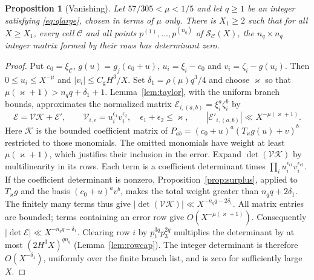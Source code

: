 \documentclass[11pt,reqno]{amsart}
\newtheorem{proposition}[theorem]{Proposition}
\theoremstyle{definition}
\theoremstyle{remark}
\numberwithin{equation}{section}
\begin{document}
\begin{proposition}[Vanishing]\label{prop:vanish}
Let $57/305<\mu<1/5$ and let $q\ge1$ be an integer satisfying
\eqref{eq:qlarge}, chosen in terms of $\mu$ only. There is $X_1\ge2$ such that for all $X\ge X_1$, every
cell $\mathcal C$ and all points $p^{(1)},\dots,p^{(n_q)}$ of
$\mathcal S_{\mathcal C}(X)$, the $n_q\times n_q$ integer matrix formed by
their rows has determinant zero.
\end{proposition}
\begin{proof}
Put $c_0=\xi_{\mathcal C}$, $g(u)=g_j(c_0+u)$,
$u_i=\xi_i-c_0$ and $v_i=\zeta_i-g(u_i)$. Then
$0\le u_i\le X^{-\mu}$ and $|v_i|\le C_{\mathrm g}H^3/X$.
Set $\delta_1=\rho(\mu)q^3/4$ and choose $\varkappa$ so that
$\mu(\varkappa+1)>n_qq+\delta_1+1$.
Lemma~\ref{lem:taylor}, with the uniform branch bounds, approximates
the normalized matrix $\mathcal E_{i,(a,b)}=\xi_i^a\zeta_i^b$ by
\[
 \mathcal E=\mathcal V\mathcal K+\mathcal E',\qquad
 \mathcal V_{i,\epsilon}=u_i^{\epsilon_1}v_i^{\epsilon_2},\quad
 \epsilon_1+\epsilon_2\le\varkappa,\qquad
 |\mathcal E'_{i,(a,b)}|\ll X^{-\mu(\varkappa+1)}.
\]
Here $\mathcal K$ is the bounded coefficient matrix of
$P_{ab}=(c_0+u)^a(T_\varkappa g(u)+v)^b$ restricted to those monomials.
The omitted monomials have weight at least $\mu(\varkappa+1)$,
which justifies their inclusion in the error.
Expand $\det(\mathcal V\mathcal K)$ by multilinearity in its rows.
Each term is a coefficient determinant times
$\prod_i u_i^{\epsilon_{i1}}v_i^{\epsilon_{i2}}$.
If the coefficient determinant is nonzero,
Proposition~\ref{prop:surplus}, applied to $T_\varkappa g$ and the basis
$(c_0+u)^av^b$, makes the total weight greater than
$n_qq+2\delta_1$. The finitely many terms thus give
$|\det(\mathcal V\mathcal K)|\ll X^{-n_qq-2\delta_1}$.
All matrix entries are bounded; terms containing an error row give
$O(X^{-\mu(\varkappa+1)})$. Consequently
$|\det\mathcal E|\ll X^{-n_qq-\delta_1}$.
Clearing row $i$ by $p_1^{3q}p_3^{2q}$ multiplies the determinant by
at most $(2H^3X)^{qn_q}$ (Lemma~\ref{lem:rowcap}). The integer
determinant is therefore $O(X^{-\delta_1})$, uniformly over the
finite branch list, and is zero for sufficiently large $X$.
\end{proof}
\end{document}
